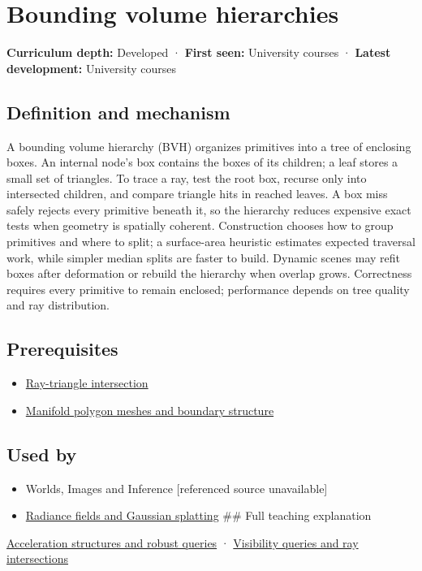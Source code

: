 \hypertarget{appendix-0b426c47dd78}{}
\section{Bounding volume hierarchies}\label{appendix-0b426c47dd78-bounding-volume-hierarchies}

\textbf{Curriculum depth:} Developed · \textbf{First seen:} University courses · \textbf{Latest development:} University courses

\subsection{Definition and mechanism}\label{appendix-0b426c47dd78-definition-and-mechanism}

A bounding volume hierarchy (BVH) organizes primitives into a tree of enclosing boxes. An internal node's box contains the boxes of its children; a leaf stores a small set of triangles. To trace a ray, test the root box, recurse only into intersected children, and compare triangle hits in reached leaves. A box miss safely rejects every primitive beneath it, so the hierarchy reduces expensive exact tests when geometry is spatially coherent. Construction chooses how to group primitives and where to split; a surface-area heuristic estimates expected traversal work, while simpler median splits are faster to build. Dynamic scenes may refit boxes after deformation or rebuild the hierarchy when overlap grows. Correctness requires every primitive to remain enclosed; performance depends on tree quality and ray distribution.

\subsection{Prerequisites}\label{appendix-0b426c47dd78-prerequisites}

\begin{itemize}
\tightlist
\item
  \hyperref[appendix-47ac1bd6d144]{Ray-triangle intersection}
\item
  \hyperref[appendix-fab348609369]{Manifold polygon meshes and boundary structure}
\end{itemize}

\subsection{Used by}\label{appendix-0b426c47dd78-used-by}

\begin{itemize}
\item
  {Worlds, Images and Inference {[}referenced source unavailable{]}}
\item
  \hyperref[appendix-c5b332e400e7]{Radiance fields and Gaussian splatting} \#\# Full teaching explanation
\end{itemize}

\hyperref[04-visual-computing-ii-ch029-acceleration-structures-and-robust-queries-1]{Acceleration structures and robust queries} · \hyperref[04-visual-computing-ii-ch028-visibility-queries-and-ray-intersections-1]{Visibility queries and ray intersections}
